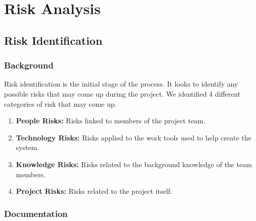 \documentclass[11pt, a4paper]{report}
\begin{document}
\chapter{Risk Analysis}

\pagebreak
\minitoc
\pagebreak

\section{Risk Identification} \label{sec:riskID}
\subsection{Background}
Risk identification is the initial stage of the process. It looks to identify any possible risks that may come up during the project. We identified 4 different categories of risk that may come up.

\begin{enumerate}
	\item 
	{\bfseries People Risks: } Risks linked to members of the project team.
	\item 
	{\bfseries Technology Risks: } Risks applied to the work tools used to help create the system.
	\item 
	{\bfseries Knowledge Risks: } Risks related to the background knowledge of the team members.
	\item 
	{\bfseries Project Risks: } Risks related to the project itself.
	
\end{enumerate}

\subsection{Documentation}
\end{document}

